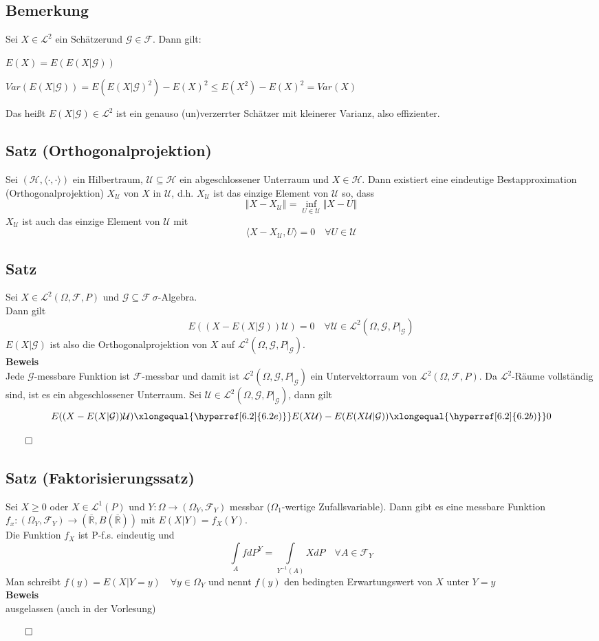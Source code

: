 \documentclass[german,10pt,oneside, fleqn, a4paper]{article}
\newcommand {\R}	{\mathbb{R}}
\newcommand{\ra}{\rightarrow}
\newcommand{\brc}[1]{\left(#1\right)}
\newcommand{\norm}[1]{\left\Vert #1 \right\Vert}
\newcommand{\QED}{\begin{flushright}$\qed$\end{flushright}}
\newcommand{\mc}[1]{\mathcal{#1}}
\newcommand{\lp}[1]{\mc{L}^{#1}}
\newcommand{\beweis}{\textbf{Beweis}\\}
\newcommand{\1}[1]{1_{#1}}
\newcommand{\2}[1]{\1{\brac{#1}}}
\newcommand{\raum}{\brc{\Omega,\mc{F},P}}
\newcommand{\g}{\mc{G}}
\newcommand{\f}{\mc{F}}
\newcommand{\h}{\mc{H}}
\newcommand{\qf}{\quad\forall}
\begin{document}
\subsection{Bemerkung}
\label{6.4}
Sei $X\in\lp{2}$ ein \glqq Schätzer\grqq und $\g\in\f$. Dann gilt:\begin{list}{•}{}
\item $E(X)=E(E(X|\g))$
\item $Var(E(X|\g))=E(E(X|\g)^2)-E(X)^2\leq E(X^2)-E(X)^2=Var(X)$
\end{list}
Das heißt $E(X|\g)\in\lp{2}$ ist ein genauso (un)verzerrter Schätzer mit kleinerer Varianz, also effizienter.

\subsection{Satz (Orthogonalprojektion)}
\label{6.5}
Sei $(\h,\langle\cdot,\cdot\rangle)$ ein Hilbertraum, $\mc{U}\subseteq \h$ ein abgeschlossener Unterraum und $X\in\h$. Dann existiert eine eindeutige Bestapproximation (Orthogonalprojektion) $X_\mc{U}$ von $X$ in $ \mc{U}$, d.h. $X_\mc{U}$ ist das einzige Element von $\mc{U}$ so, dass \[
\norm{X-X_\mc{U}}=\inf\limits_{U\in\mc{U}}\norm{X-U}\]
$X_\mc{U}$ ist auch das einzige Element von $\mc{U}$ mit \[
\langle X-X_\mc{U},U\rangle=0\quad\forall U\in\mc{U}\]

\subsection{Satz}
\label{6.6}
Sei $X\in\lp{2}\raum$ und $\g\subseteq\f\ \sigma$-Algebra.\\
Dann gilt\[
E((X-E(X|\g))\mc{U})=0\qf\mc{U}\in\lp{2}(\Omega,\g,P|_\g)\]
$E(X|\g)$ ist also die Orthogonalprojektion von $X$ auf $\lp{2}(\Omega,\g,P|_\g)$.\\
\beweis
Jede $\g$-messbare Funktion ist $\f$-messbar und damit ist $\lp{2}(\Omega,\g,P|_\g)$ ein Untervektorraum von $\lp{2}\raum$. Da $\lp{2}$-Räume vollständig sind, ist es ein abgeschlossener Unterraum. Sei $\mc{U}\in\lp{2}(\Omega,\g,P|_\g)$, dann gilt\[
E((X-E(X|\g))\mc{U})\xlongequal{\hyperref[6.2]{6.2 e)}}E(X\mc{U})-E(E(X\mc{U}|\g))\xlongequal{\hyperref[6.2]{6.2 b)}}0\]\QED

\subsection{Satz (Faktorisierungssatz)}
\label{6.7}
Sei $X\geq 0$ oder $X\in\lp{1}(P)$ und $Y:\Omega\ra(\Omega_Y,\f_Y)$ messbar ($\Omega_1$-wertige Zufallsvariable). Dann gibt es eine messbare Funktion $f_x:(\Omega_Y,\f_Y)\ra(\overline{\R},B(\overline{\R}))$ mit $E(X|Y)=f_X(Y)$.\\
Die Funktion $f_X$ ist P-f.s. eindeutig und \[
\int\limits_Af dP^Y=\int\limits_{Y^{-1}(A)}XdP\qf A\in\f_Y\]
Man schreibt $f(y)=E(X|Y=y)\qf y\in\Omega_Y$ und nennt $f(y)$ den bedingten Erwartungswert von $X$ unter $Y=y$\\
\beweis
ausgelassen (auch in der Vorlesung)\QED
\end{document}

